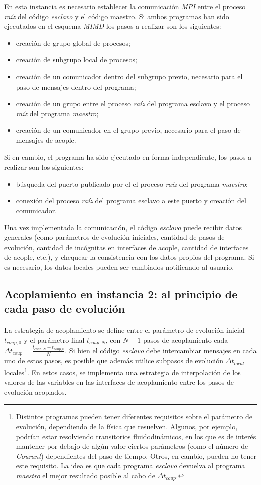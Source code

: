 En esta instancia es necesario establecer la comunicación \textit{MPI} entre el proceso \textit{raíz} del código \textit{esclavo} y el código maestro.
Si ambos programas han sido ejecutados en el esquema \textit{MIMD} los pasos a realizar son los siguientes:
\begin{itemize}
\item creación de grupo global de procesos;
\item creación de subgrupo local de procesos;
\item creación de un comunicador dentro del subgrupo previo, necesario para el paso de mensajes dentro del programa;
\item creación de un grupo entre el proceso \textit{raíz} del programa esclavo y el proceso \textit{raíz} del programa \textit{maestro};
\item creación de un comunicador en el grupo previo, necesario para el paso de mensajes de acople.
\end{itemize}
Si en cambio, el programa ha sido ejecutado en forma independiente, los pasos a realizar son los siguientes:
\begin{itemize}
\item búsqueda del puerto publicado por el el proceso \textit{raíz} del programa \textit{maestro};
\item conexión del proceso \textit{raíz} del programa esclavo a este puerto y creación del comunicador.
\end{itemize}
Una vez implementada la comunicación, el código \textit{esclavo} puede recibir datos generales 
(como parámetros de evolución iniciales, cantidad de pasos de evolución, cantidad de incógnitas en interfaces de acople, cantidad de interfaces de acople, etc.),
y chequear la consistencia con los datos propios del programa.
Si es necesario, los datos locales pueden ser cambiados notificando al usuario.

\subsection*{Acoplamiento en instancia 2: al principio de cada paso de evolución}

La estrategia de acoplamiento se define entre el parámetro de evolución inicial $t_{coup,0}$ y el parámetro final $t_{coup,N}$,
con $N+1$ pasos de acoplamiento cada $\Delta t_{coup}=\frac{t_{coup,N} - t_{coup,0}}{N}$.
Si bien el código \textit{esclavo} debe intercambiar mensajes en cada uno de estos pasos, es posible que además utilice subpasos de evolución $\Delta t_{local}$ locales\footnote{
Distintos programas pueden tener diferentes requisitos sobre el parámetro de evolución, dependiendo de la física que resuelven.
Algunos, por ejemplo, podrían estar resolviendo transitorios fluidodinámicos, en los que es de interés mantener por debajo de algún valor 
ciertos parámetros (como el número de \textit{Courant}) dependientes del paso de tiempo.
Otros, en cambio, pueden no tener este requisito.
La idea es que cada programa \textit{esclavo} devuelva al programa \textit{maestro} el mejor resultado posible al cabo de $\Delta t_{coup}$.
}. En estos casos, se implementa una estrategia de interpolación de los valores de las variables en las interfaces de acoplamiento entre los pasos de evolución acoplados.

